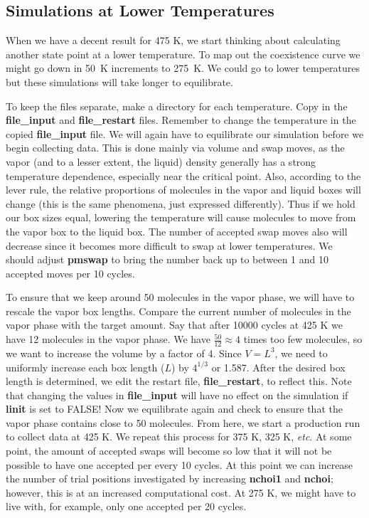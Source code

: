 \documentclass[12pt,letterpaper]{article}
\begin{document}
\subsection{Simulations at Lower Temperatures}
When we have a decent result for 475 K, we start thinking
about calculating another state point at a lower
temperature. To map out the coexistence curve we might go
down in 50~K increments to 275~K. We could go to lower
temperatures but these simulations will take longer to
equilibrate.

To keep the files separate, make a directory for each
temperature. Copy in the {\bf file\_input} and {\bf
  file\_restart} files. Remember to change the temperature
in the copied {\bf file\_input} file. We will again have to
equilibrate our simulation before we begin collecting data.
This is done mainly via volume and swap moves, as the vapor
(and to a lesser extent, the liquid) density generally has a
strong temperature dependence, especially near the critical
point. Also, according to the lever rule, the relative
proportions of molecules in the vapor and liquid boxes will
change (this is the same phenomena, just expressed
differently). Thus if we hold our box sizes equal, lowering
the temperature will cause molecules to move from the vapor
box to the liquid box. The number of accepted swap moves
also will decrease since it becomes more difficult to swap
at lower temperatures. We should adjust {\bf pmswap} to
bring the number back up to between 1 and 10 accepted moves per 10 cycles.

To ensure that we keep around 50 molecules in the vapor
phase, we will have to rescale the vapor box lengths.
Compare the current number of molecules in the vapor phase
with the target amount. Say that after 10000 cycles at 425 K
we have 12 molecules in the vapor phase. We have
$\frac{50}{12} \approx 4$ times too few molecules, so we
want to increase the volume by a factor of 4. Since $V=L^3$,
we need to uniformly increase each box length ($L$) by
$4^{1/3}$ or 1.587. After the desired box length is
determined, we edit the restart file, {\bf file\_restart},
to reflect this. Note that changing the values in {\bf
  file\_input} will have no effect on the simulation if {\bf
  linit} is set to FALSE! Now we equilibrate again and check
to ensure that the vapor phase contains close to 50
molecules. From here, we start a production run to collect
data at 425 K. We repeat this process for 375 K, 325 K, {\it
  etc}. At some point, the amount of accepted swaps will
become so low that it will not be possible to have one
accepted per every 10 cycles. At this point we can increase
the number of trial positions investigated by increasing
{\bf nchoi1} and {\bf nchoi}; however, this is at an
increased computational cost. At 275 K, we might have to
live with, for example, only one accepted per 20 cycles.
\end{document}
